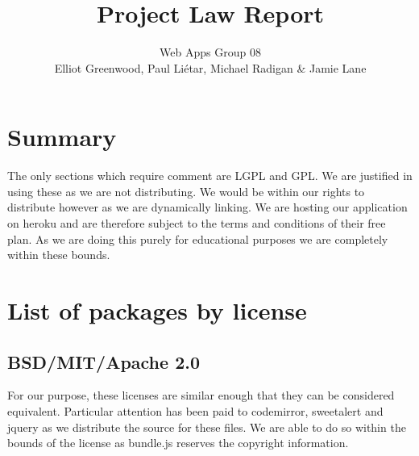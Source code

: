 \documentclass[a4paper]{article}
\title{Project Law Report}
\author{Web Apps Group 08 \\ Elliot Greenwood, Paul Li\'etar, Michael Radigan \& Jamie Lane}
\date{}
\begin{document}
\maketitle

\section{Summary}
The only sections which require comment are LGPL and GPL. We are justified in using these as we are not distributing. We would be within our rights to distribute however as we are dynamically linking. We are hosting our application on heroku and are therefore subject to the terms and conditions of their free plan. As we are doing this purely for educational purposes we are completely within these bounds.

\section{List of packages by license}

\subsection{BSD/MIT/Apache 2.0}
	For our purpose, these licenses are similar enough that they can be considered equivalent. Particular attention has been paid to codemirror, sweetalert and jquery as we distribute the source for these files. We are able to do so within the bounds of the license as bundle.js reserves the copyright information.
\end{document}
